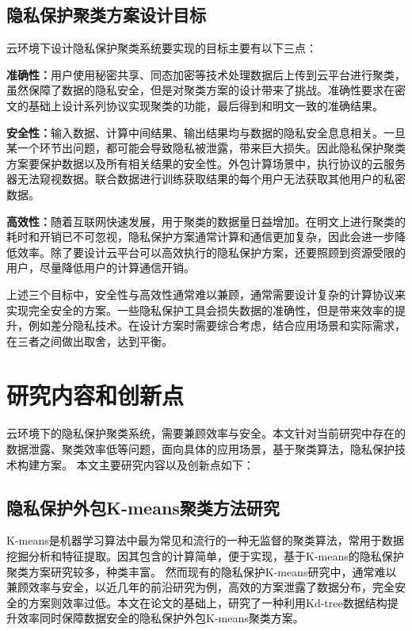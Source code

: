 \subsection{隐私保护聚类方案设计目标}
云环境下设计隐私保护聚类系统要实现的目标主要有以下三点：
\begin{compactitem}
	\item \textbf{准确性：}用户使用秘密共享、同态加密等技术处理数据后上传到云平台进行聚类，虽然保障了数据的隐私安全，但是对聚类方案的设计带来了挑战。准确性要求在密文的基础上设计系列协议实现聚类的功能，最后得到和明文一致的准确结果。
	\item \textbf{安全性：}输入数据、计算中间结果、输出结果均与数据的隐私安全息息相关。一旦某一个环节出问题，都可能会导致隐私被泄露，带来巨大损失。因此隐私保护聚类方案要保护数据以及所有相关结果的安全性。外包计算场景中，执行协议的云服务器无法窥视数据。联合数据进行训练获取结果的每个用户无法获取其他用户的私密数据。
	\item \textbf{高效性：}随着互联网快速发展，用于聚类的数据量日益增加。在明文上进行聚类的耗时和开销已不可忽视，隐私保护方案通常计算和通信更加复杂，因此会进一步降低效率。除了要设计云平台可以高效执行的隐私保护方案，还要照顾到资源受限的用户，尽量降低用户的计算通信开销。
\end{compactitem}

上述三个目标中，安全性与高效性通常难以兼顾，通常需要设计复杂的计算协议来实现完全安全的方案。一些隐私保护工具会损失数据的准确性，但是带来效率的提升，例如差分隐私技术。在设计方案时需要综合考虑，结合应用场景和实际需求，在三者之间做出取舍，达到平衡。
\section{研究内容和创新点}
云环境下的隐私保护聚类系统，需要兼顾效率与安全。本文针对当前研究中存在的数据泄露、聚类效率低等问题，面向具体的应用场景，基于聚类算法，隐私保护技术构建方案。
本文主要研究内容以及创新点如下：
\subsection{隐私保护外包K-means聚类方法研究}
K-means是机器学习算法中最为常见和流行的一种无监督的聚类算法，常用于数据挖掘分析和特征提取。因其包含的计算简单，便于实现，基于K-means的隐私保护聚类方案研究较多，种类丰富。
然而现有的隐私保护K-means研究中，通常难以兼顾效率与安全，以近几年的前沿研究为例，高效的方案泄露了数据分布\cite{wu2020secure}，完全安全的方案则效率过低\cite{jaschke2019unsupervised}。本文在论文\cite{kanungo2002efficient}的基础上，研究了一种利用Kd-tree数据结构提升效率同时保障数据安全的隐私保护外包K-means聚类方案。

